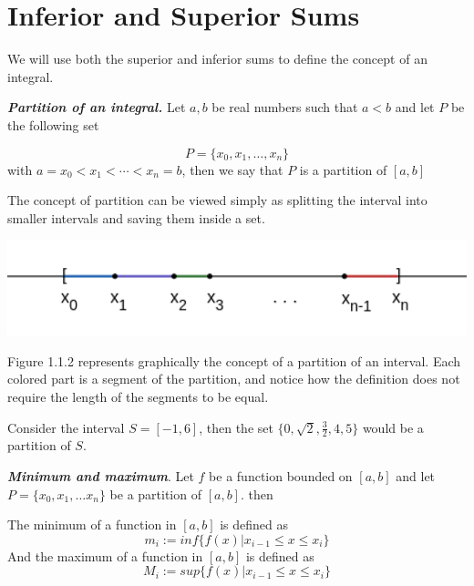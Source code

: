 \documentclass{report}
\begin{document}
    \section{Inferior and Superior Sums}
    We will use both the superior and inferior sums to define the concept of an integral.

    \begin{defBox}
        \textit{\textbf{Partition of an integral.}} Let $a, b$ be real numbers such that $a<b$ and let $P$ be the following set

        $$P = \{x_0, x_1, \dots , x_n\}$$ with $a=x_0<x_1<\cdots<x_n=b$, then we say that $P$ is a partition of $[a,b]$
    \end{defBox}

    The concept of partition can be viewed simply as splitting the interval into smaller intervals and saving them inside a set.
    \begin{Figure}
        \begin{center}
            \includegraphics[width=1\textwidth]{images/partitions2.png}
        \end{center}
    \end{Figure}
    Figure 1.1.2 represents graphically the concept of a partition of an interval. Each colored part is a segment of the partition, and notice how the definition does not require the length of the segments to be equal.

    \begin{Example}
        Consider the interval $S = [-1, 6]$, then the set $\{0, \sqrt{2}, \frac{3}{2}, 4, 5\}$ would be a partition of $S$.
    \end{Example}
    \begin{defBox}
        \textit{\textbf{Minimum and maximum}}. Let $f$ be a function bounded on $[a,b]$ and let $P = \{x_0, x_1, \dots x_n\}$ be a partition of $[a,b]$. then

        The minimum of a function in $[a,b]$ is defined as
        $$m_i := inf\{f(x) | x_{i-1} \leq x \leq x_i\}$$
        And the maximum of a function in $[a,b]$ is defined as
        $$M_i := sup\{f(x) | x_{i-1} \leq x \leq x_i\}$$
    \end{defBox}
\end{document}
